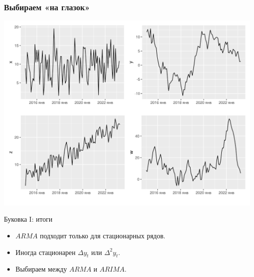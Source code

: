\begin{frame}
  \frametitle{Выбираем «на глазок»}
  \includegraphics[width=\textwidth]{pictures/om_ts_06-027.png}
\end{frame}



\begin{frame}{Буковка I: итоги}

  \begin{itemize}[<+->]
    \item $ARMA$ подходит только для \alert{стационарных} рядов. 
    \item Иногда стационарен $\Delta y_t$ или $\Delta^2 y_t$. 
    \item Выбираем между $ARMA$ и $ARIMA$.
  \end{itemize}
\end{frame}

